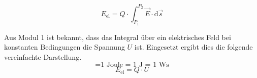 {\begin{equation}
	E_\mathrm{el} = Q \cdot \int_{P_\mathrm{1}}^{P_\mathrm{2}} \vec{E} \cdot \mathrm{d}\vec{s}
\end{equation}

Aus Modul 1 ist bekannt, dass das Integral über ein elektrisches Feld bei konstanten Bedingungen die Spannung $U$ ist. 
Eingesetzt ergibt dies die folgende vereinfachte Darstellung.
\newpage
\begin{equation*}
	[E_\mathrm{el}] = \text{1 Joule = 1 J = 1 Ws} 
\end{equation*}
\vspace{0.1cm}
\begin{equation}
    E_\mathrm{el} = Q \cdot U
\end{equation}

}%


